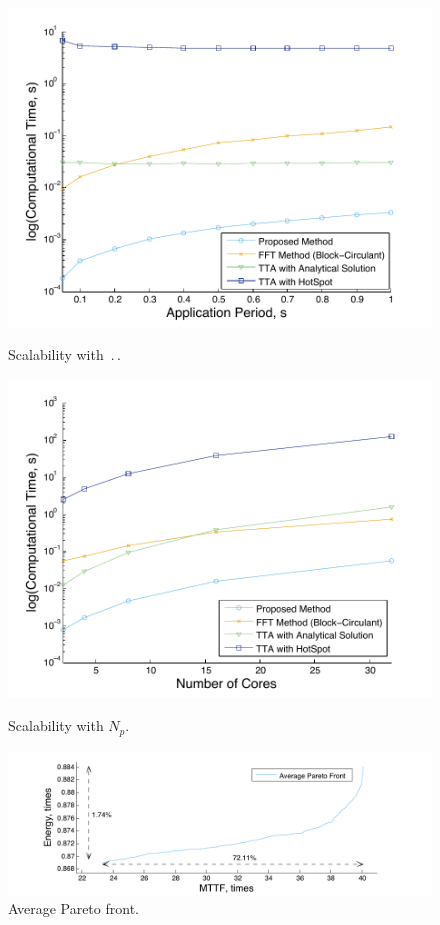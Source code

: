 \begin{figure}
  \centering
  \begin{minipage}{0.30\linewidth}
    \includegraphics[clip=true, trim=15 0 15 0, width=\linewidth]{assets/scaling-time.pdf}
    \caption{Scalability with $\period$.}
    \label{fig:scaling-time}
  \end{minipage}
  \begin{minipage}{0.30\linewidth}
    \includegraphics[clip=true, trim=15 0 15 0, width=\linewidth]{assets/scaling-cores.pdf}
    \caption{Scalability with $N_p$.}
    \label{fig:scaling-cores}
  \end{minipage}
  \begin{minipage}{0.35\linewidth}
    \includegraphics[clip=true, trim=50 0 50 0, width=\linewidth]{assets/average-pareto.pdf}
    \caption{Average Pareto front.}
    \label{fig:average-pareto}
  \end{minipage}
\end{figure}

